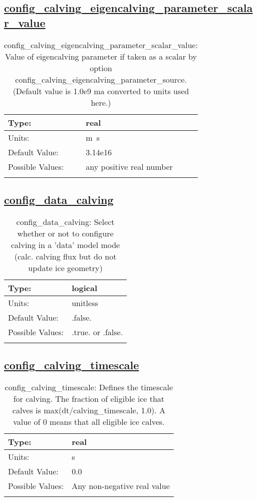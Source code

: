 \subsection[config\_calving\_eigencalving\_parameter\_scalar\_value]{\hyperref[sec:nm_tab_calving]{config\_calving\_eigencalving\_parameter\_scalar\_value}}
\label{subsec:nm_sec_config_calving_eigencalving_parameter_scalar_value}
\begin{center}
\begin{longtable}{| p{2.0in} || p{4.0in} |}
    \hline
    Type: & real \\
    \hline
    Units: & \si{m.s} \\
    \hline
    Default Value: & 3.14e16 \\
    \hline
    Possible Values: & any positive real number \\
    \hline
    \caption{config\_calving\_eigencalving\_parameter\_scalar\_value: Value of eigencalving parameter if taken as a scalar by option config\_calving\_eigencalving\_parameter\_source. (Default value is 1.0e9 ma converted to units used here.)}
\end{longtable}
\end{center}
\subsection[config\_data\_calving]{\hyperref[sec:nm_tab_calving]{config\_data\_calving}}
\label{subsec:nm_sec_config_data_calving}
\begin{center}
\begin{longtable}{| p{2.0in} || p{4.0in} |}
    \hline
    Type: & logical \\
    \hline
    Units: & \si{unitless} \\
    \hline
    Default Value: & .false. \\
    \hline
    Possible Values: & .true. or .false. \\
    \hline
    \caption{config\_data\_calving: Select whether or not to configure calving in a 'data' model mode (calc. calving flux but do not update ice geometry)}
\end{longtable}
\end{center}
\subsection[config\_calving\_timescale]{\hyperref[sec:nm_tab_calving]{config\_calving\_timescale}}
\label{subsec:nm_sec_config_calving_timescale}
\begin{center}
\begin{longtable}{| p{2.0in} || p{4.0in} |}
    \hline
    Type: & real \\
    \hline
    Units: & \si{s} \\
    \hline
    Default Value: & 0.0 \\
    \hline
    Possible Values: & Any non-negative real value \\
    \hline
    \caption{config\_calving\_timescale: Defines the timescale for calving. The fraction of eligible ice that calves is max(dt/calving\_timescale, 1.0). A value of 0 means that all eligible ice calves.}
\end{longtable}
\end{center}
